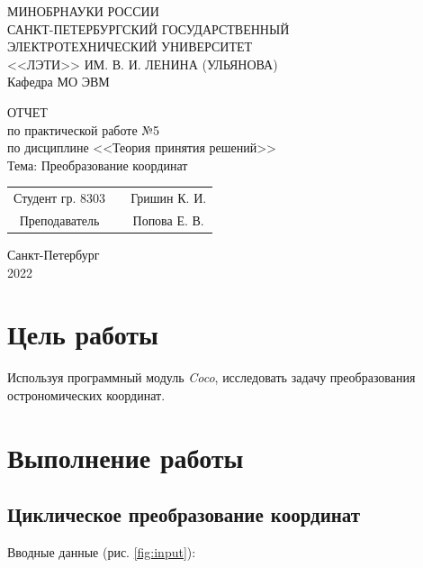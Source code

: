 \documentclass[14pt,a4paper]{extarticle}%
\begin{document}
\begin{titlepage}
  \begin{center}
    МИНОБРНАУКИ РОССИИ\\
    САНКТ-ПЕТЕРБУРГСКИЙ ГОСУДАРСТВЕННЫЙ\\
    ЭЛЕКТРОТЕХНИЧЕСКИЙ УНИВЕРСИТЕТ\\
    <<ЛЭТИ>> ИМ. В. И. ЛЕНИНА (УЛЬЯНОВА)\\
    Кафедра МО ЭВМ

    \vspace{4cm}

    ОТЧЕТ\\
    по практической работе №5\\
    по дисциплине <<Теория принятия решений>>\\
    Тема: Преобразование координат
    \vfill

    \begin{tabular}{ c c c }
      Студент гр. 8303 & \uline{\hspace{3cm}} & Гришин К. И. \\[1cm]
      Преподаватель    & \uline{\hspace{3cm}} & Попова Е. В. \\
    \end{tabular}
    
    \vfill
    Санкт-Петербург\\
    2022
  \end{center}
\end{titlepage}


\section{Цель работы}
Используя программный модуль \textit{Coco}, исследовать задачу
преобразования острономических координат.

\section{Выполнение работы}

\subsection{Циклическое преобразование координат}
Вводные данные (рис. \ref{fig:input}):
\end{document}
